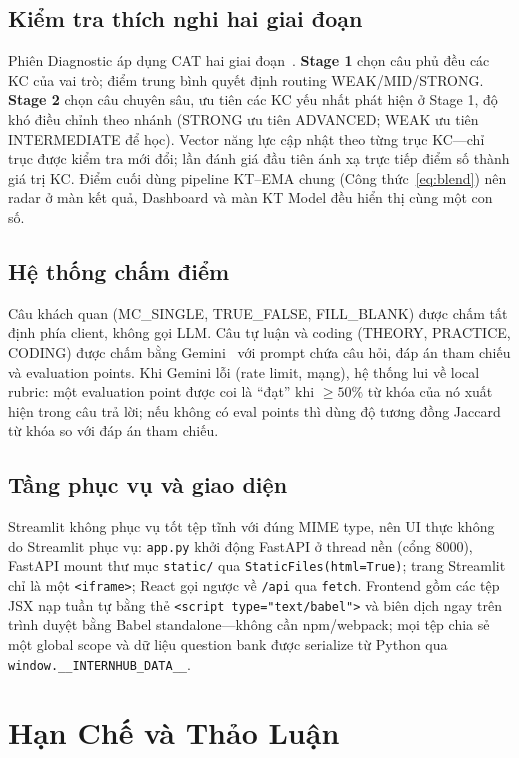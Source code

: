 \documentclass[conference]{IEEEtran}
\begin{document}
\subsection{Kiểm tra thích nghi hai giai đoạn}
Phiên Diagnostic áp dụng CAT hai giai đoạn~\cite{wainer2000computerized}. \textbf{Stage 1} chọn câu phủ đều các KC của vai trò; điểm trung bình quyết định routing WEAK/MID/STRONG. \textbf{Stage 2} chọn câu chuyên sâu, ưu tiên các KC yếu nhất phát hiện ở Stage 1, độ khó điều chỉnh theo nhánh (STRONG ưu tiên ADVANCED; WEAK ưu tiên INTERMEDIATE để học). Vector năng lực cập nhật theo từng trục KC---chỉ trục được kiểm tra mới đổi; lần đánh giá đầu tiên ánh xạ trực tiếp điểm số thành giá trị KC. Điểm cuối dùng pipeline KT--EMA chung (Công thức~\eqref{eq:blend}) nên radar ở màn kết quả, Dashboard và màn KT Model đều hiển thị cùng một con số.

\subsection{Hệ thống chấm điểm}
Câu khách quan (MC\_SINGLE, TRUE\_FALSE, FILL\_BLANK) được chấm tất định phía client, không gọi LLM. Câu tự luận và coding (THEORY, PRACTICE, CODING) được chấm bằng Gemini~\cite{team2023gemini} với prompt chứa câu hỏi, đáp án tham chiếu và evaluation points. Khi Gemini lỗi (rate limit, mạng), hệ thống lui về local rubric: một evaluation point được coi là ``đạt'' khi $\geq 50\%$ từ khóa của nó xuất hiện trong câu trả lời; nếu không có eval points thì dùng độ tương đồng Jaccard từ khóa so với đáp án tham chiếu.

\subsection{Tầng phục vụ và giao diện}
Streamlit không phục vụ tốt tệp tĩnh với đúng MIME type, nên UI thực không do Streamlit phục vụ: \texttt{app.py} khởi động FastAPI ở thread nền (cổng 8000), FastAPI mount thư mục \texttt{static/} qua \texttt{StaticFiles(html=True)}; trang Streamlit chỉ là một \texttt{<iframe>}; React gọi ngược về \texttt{/api} qua \texttt{fetch}. Frontend gồm các tệp JSX nạp tuần tự bằng thẻ \texttt{<script type="text/babel">} và biên dịch ngay trên trình duyệt bằng Babel standalone---không cần npm/webpack; mọi tệp chia sẻ một global scope và dữ liệu question bank được serialize từ Python qua \texttt{window.\_\_INTERNHUB\_DATA\_\_}.

\section{Hạn Chế và Thảo Luận}
\label{sec:limit}
\end{document}
